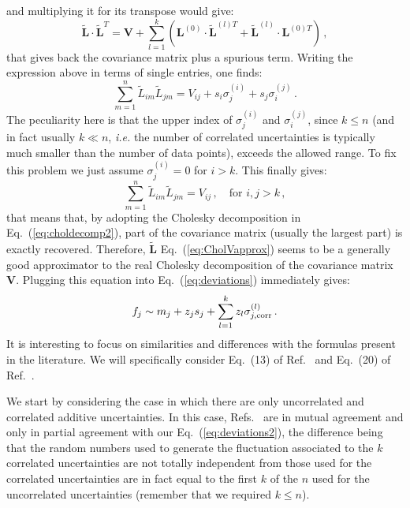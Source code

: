 \documentclass[10pt,a4paper]{article}
\begin{document}
and multiplying it for its transpose would give:
\begin{equation}
\widetilde{\mathbf{L}}\cdot \widetilde{\mathbf{L}}^T = \mathbf{V} + \sum_{l=1}^k\left(\mathbf{L}^{(0)}\cdot \widetilde{\mathbf{L}}^{(l)T}+\widetilde{\mathbf{L}}^{(l)}\cdot \mathbf{L}^{(0)T}\right)\,,
\end{equation}
that gives back the covariance matrix plus a spurious term. Writing
the expression above in terms of single entries, one finds:
\begin{equation}
\sum_{m=1}^n\widetilde{L}_{im}\widetilde{L}_{jm} = V_{ij} + s_i \sigma_{j}^{(i)}+s_j\sigma_{i}^{(j)}\,.
\end{equation}
The peculiarity here is that the upper index of $\sigma_{j}^{(i)}$ and
$\sigma_{i}^{(j)}$, since $k\leq n$ (and in fact usually $k\ll n$,
\textit{i.e.} the number of correlated uncertainties is typically much
smaller than the number of data points), exceeds the allowed range. To
fix this problem we just assume $\sigma_{j}^{(i)}=0$ for $i>k$. This
finally gives:
\begin{equation}
\sum_{m=1}^n\widetilde{L}_{im}\widetilde{L}_{jm} = V_{ij}\,,\quad
\mbox{for } i,j>k\,,
\end{equation}
that means that, by adopting the Cholesky decomposition in
Eq.~(\ref{eq:choldecomp2}), part of the covariance matrix (usually the
largest part) is exactly recovered. Therefore,
$\widetilde{\mathbf{L}}$ Eq.~(\ref{eq:CholVapprox}) seems to be a
generally good approximator to the real Cholesky decomposition of the
covariance matrix $\mathbf{V}$. Plugging this equation into
Eq.~(\ref{eq:deviations}) immediately gives:
\begin{equation}\label{eq:deviations2}
  f_j\sim m_j+z_js_j + \sum_{l=1}^{k}z_l \sigma_{j,\rm
    corr}^{(l)}\,.
\end{equation}
It is interesting to focus on similarities and differences with the
formulas present in the literature. We will specifically consider
Eq.~(13) of Ref.~\cite{Ball:2008by} and Eq.~(20) of
Ref.~\cite{Ball:2014uwa}.

We start by considering the case in which there are only uncorrelated
and correlated additive uncertainties. In this case,
Refs.~\cite{Ball:2008by, Ball:2014uwa} are in mutual agreement and
only in partial agreement with our Eq.~(\ref{eq:deviations2}), the
difference being that the random numbers used to generate the
fluctuation associated to the $k$ correlated uncertainties are not
totally independent from those used for the correlated uncertainties
are in fact equal to the first $k$ of the $n$ used for the
uncorrelated uncertainties (remember that we required $k\leq n$).
\end{document}
